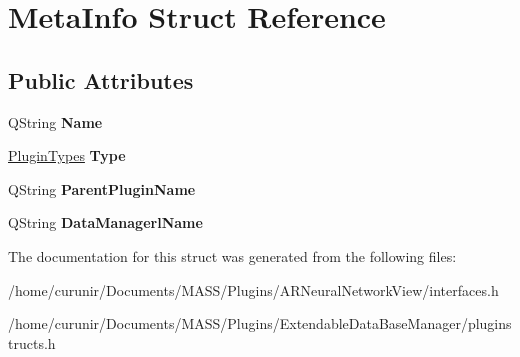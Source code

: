 \hypertarget{struct_meta_info}{}\section{Meta\+Info Struct Reference}
\label{struct_meta_info}
\subsection*{Public Attributes}
\begin{DoxyCompactItemize}
\item 
Q\+String {\bfseries Name}\hypertarget{struct_meta_info_a5a2f44643b5406699d1fb9ef742ab331}{}\label{struct_meta_info_a5a2f44643b5406699d1fb9ef742ab331}

\item 
\hyperlink{group___main_menu_module_ga9b3bee49ce70df90694056c2f48c2e77}{Plugin\+Types} {\bfseries Type}\hypertarget{struct_meta_info_aaaf1d51db4890bb4f5cbb08ea15b5940}{}\label{struct_meta_info_aaaf1d51db4890bb4f5cbb08ea15b5940}

\item 
Q\+String {\bfseries Parent\+Plugin\+Name}\hypertarget{struct_meta_info_a01ddb956e9390d748f8d3812521d17ff}{}\label{struct_meta_info_a01ddb956e9390d748f8d3812521d17ff}

\item 
Q\+String {\bfseries Data\+Managerl\+Name}\hypertarget{struct_meta_info_aa2b9d929a6ef2956c60d4bb029371669}{}\label{struct_meta_info_aa2b9d929a6ef2956c60d4bb029371669}

\end{DoxyCompactItemize}


The documentation for this struct was generated from the following files\+:\begin{DoxyCompactItemize}
\item 
/home/curunir/\+Documents/\+M\+A\+S\+S/\+Plugins/\+A\+R\+Neural\+Network\+View/interfaces.\+h\item 
/home/curunir/\+Documents/\+M\+A\+S\+S/\+Plugins/\+Extendable\+Data\+Base\+Manager/pluginstructs.\+h\end{DoxyCompactItemize}
